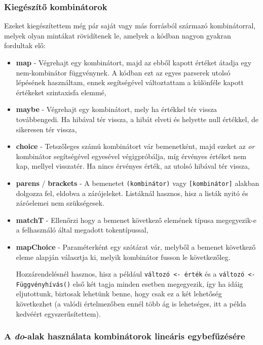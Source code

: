 \subsubsection{Kiegészítő kombinátorok}

Ezeket kiegészítettem még pár saját vagy más forrásból származó kombinátorral, melyek olyan mintákat rövidítenek le, amelyek a kódban nagyon gyakran fordultak elő:

\begin{itemize}
    \item \textbf{map} - Végrehajt egy kombinátort, majd az ebből kapott értéket átadja egy nem-kombinátor függvénynek. A kódban ezt az egyes parserek utolsó lépésének használtam, ennek segítségével változtattam a különféle kapott értékeket szintaxisfa elemmé,
    \item \textbf{maybe} - Végrehajt egy kombinátort, mely ha értékkel tér vissza továbbengedi. Ha hibával tér vissza, a hibát elveti és helyette null értékkel, de sikeresen tér vissza,
    \item \textbf{choice} - Tetszőleges számú kombinátort vár bemenetként, majd ezeket az \textit{or} kombinátor segítségével egyesével végigpróbálja, míg érvényes értéket nem kap, mellyel visszatér. Ha nincs érvényes érték, az utolsó hibával tér vissza,
    \item \textbf{parens} / \textbf{brackets} - A bemenetet \verb_(kombinátor)_ vagy \verb_[kombinátor]_ alakban dolgozza fel, eldobva a zárójeleket. Listáknál hasznos, hisz a listák nyitó és záróelemei nem szükségesek.
    \item \textbf{matchT} - Ellenőrzi hogy a bemenet következő elemének típusa megegyezik-e a felhasználó által megadott tokentípussal,
    \item \textbf{mapChoice} - Paraméterként egy szótárat vár, melyből a bemenet következő eleme alapján választja ki, melyik kombinátor fusson le következőleg.
    
    Hozzárendelésnél hasznos, hisz a például \texttt{változó <- érték} és a \texttt{változó <- Függvényhívás()} első két tagja minden esetben megegyezik, így ha idáig eljutottunk, biztosak lehetünk benne, hogy csak ez a két lehetőség következhet (a valódi értelmezőben ennél több ág is lehetséges, itt a példa kedvéért egyszerűsítettem).
\end{itemize}

\subsubsection{A \textit{do}-alak használata kombinátorok lineáris egybefűzésére}

